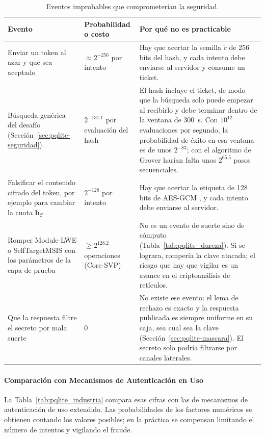 \begin{table}[H]
\centering
\caption{Eventos improbables que comprometerían la seguridad.}
\label{tab:pqlite_improbables_peligrosos}
\small
\begin{tabularx}{\textwidth}{>{\raggedright\arraybackslash}p{4.0cm}>{\raggedright\arraybackslash}p{3.3cm}Y}
\toprule
\textbf{Evento} & \textbf{Probabilidad o costo} & \textbf{Por qué no es practicable} \\
\midrule
Enviar un token al azar y que sea aceptado & $\approx 2^{-256}$ por intento & Hay que acertar la semilla $\tilde{c}$ de 256 bits del hash, y cada intento debe enviarse al servidor y consume un ticket. \\
Búsqueda genérica del desafío (Sección~\ref{sec:pqlite-seguridad}) & $2^{-131.1}$ por evaluación del hash & El hash incluye el ticket, de modo que la búsqueda solo puede empezar al recibirlo y debe terminar dentro de la ventana de 300~s. Con $10^{12}$ evaluaciones por segundo, la probabilidad de éxito en esa ventana es de unos $2^{-83}$; con el algoritmo de Grover harían falta unos $2^{65.5}$ pasos secuenciales. \\
Falsificar el contenido cifrado del token, por ejemplo para cambiar la cuota $\mathbf{b}_{\mathcal{C}}$ & $2^{-128}$ por intento & Hay que acertar la etiqueta de 128 bits de AES-GCM \cite{dworkin2007gcm}, y cada intento debe enviarse al servidor. \\
Romper Module-LWE o SelfTargetMSIS con los parámetros de la capa de prueba & $\ge 2^{128.2}$ operaciones (Core-SVP) & No es un evento de suerte sino de cómputo (Tabla~\ref{tab:pqlite_dureza}). Si se lograra, rompería la clave atacada; el riesgo que hay que vigilar es un avance en el criptoanálisis de retículos. \\
Que la respuesta filtre el secreto por mala suerte & $0$ & No existe ese evento: el lema de rechazo es exacto y la respuesta publicada es siempre uniforme en su caja, sea cual sea la clave (Sección~\ref{sec:pqlite-mascara}). El secreto solo podría filtrarse por canales laterales. \\
\bottomrule
\end{tabularx}
\end{table}

\paragraph{Comparación con Mecanismos de Autenticación en Uso}
La Tabla~\ref{tab:pqlite_industria} compara esas cifras con las de mecanismos de autenticación de uso extendido. Las probabilidades de los factores numéricos se obtienen contando los valores posibles; en la práctica se compensan limitando el número de intentos y vigilando el fraude.

